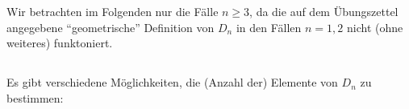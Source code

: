 \section{}

Wir betrachten im Folgenden nur die Fälle $n \geq 3$, da die auf dem Übungszettel angegebene \enquote{geometrische} Definition von $D_n$ in den Fällen $n = 1, 2$ nicht (ohne weiteres) funktoniert.





\subsection{}

Es gibt verschiedene Möglichkeiten, die (Anzahl der) Elemente von $D_n$ zu bestimmen:

